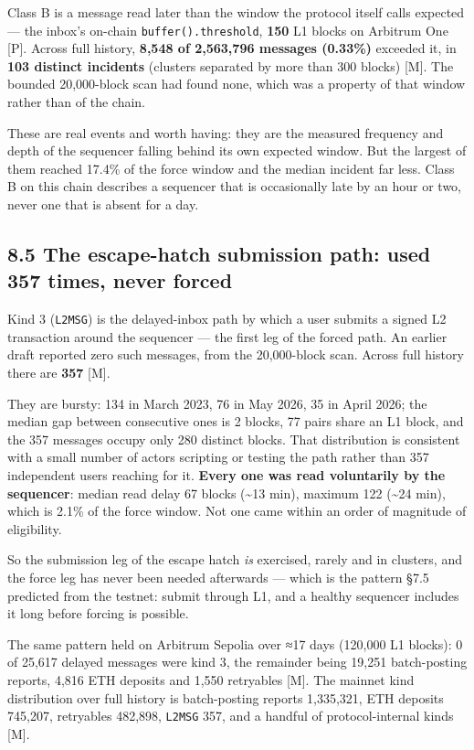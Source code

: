 \documentclass[conference]{IEEEtran}
\renewcommand{\_}{\textunderscore\allowbreak}
\begin{document}
Class B is a message read later than the window the protocol itself
calls expected --- the inbox's on-chain \texttt{buffer().threshold},
\textbf{150} L1 blocks on Arbitrum One {[}P{]}. Across full history,
\textbf{8,548 of 2,563,796 messages (0.33\%)} exceeded it, in
\textbf{103 distinct incidents} (clusters separated by more than 300
blocks) {[}M{]}. The bounded 20,000-block scan had found none, which was
a property of that window rather than of the chain.

These are real events and worth having: they are the measured frequency
and depth of the sequencer falling behind its own expected window. But
the largest of them reached 17.4\% of the force window and the median
incident far less. Class B on this chain describes a sequencer that is
occasionally late by an hour or two, never one that is absent for a day.

\subsection{8.5 The escape-hatch submission path: used 357 times, never
forced}\label{the-escape-hatch-submission-path-used-357-times-never-forced}

Kind 3 (\texttt{L2\_MSG}) is the delayed-inbox path by which a user
submits a signed L2 transaction around the sequencer --- the first leg
of the forced path. An earlier draft reported zero such messages, from
the 20,000-block scan. Across full history there are \textbf{357}
{[}M{]}.

They are bursty: 134 in March 2023, 76 in May 2026, 35 in April 2026;
the median gap between consecutive ones is 2 blocks, 77 pairs share an
L1 block, and the 357 messages occupy only 280 distinct blocks. That
distribution is consistent with a small number of actors scripting or
testing the path rather than 357 independent users reaching for it.
\textbf{Every one was read voluntarily by the sequencer}: median read
delay 67 blocks (\textasciitilde13 min), maximum 122 (\textasciitilde24
min), which is 2.1\% of the force window. Not one came within an order
of magnitude of eligibility.

So the submission leg of the escape hatch \emph{is} exercised, rarely
and in clusters, and the force leg has never been needed afterwards ---
which is the pattern §7.5 predicted from the testnet: submit through L1,
and a healthy sequencer includes it long before forcing is possible.

The same pattern held on Arbitrum Sepolia over ≈17 days (120,000 L1
blocks): 0 of 25,617 delayed messages were kind 3, the remainder being
19,251 batch-posting reports, 4,816 ETH deposits and 1,550 retryables
{[}M{]}. The mainnet kind distribution over full history is
batch-posting reports 1,335,321, ETH deposits 745,207, retryables
482,898, \texttt{L2\_MSG} 357, and a handful of protocol-internal kinds
{[}M{]}.
\end{document}
